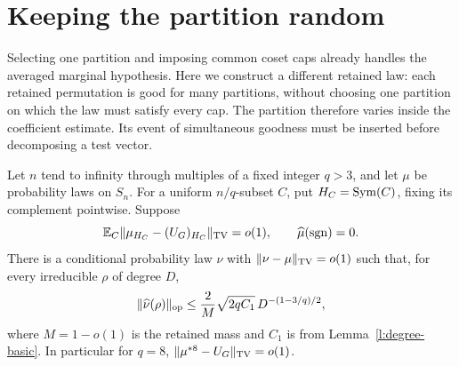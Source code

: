 \section{Keeping the partition random}
\label{l:random-partition-section}

Selecting one partition and imposing common coset caps already handles the
averaged marginal hypothesis. Here we construct a different retained law:
each retained permutation is good for many partitions, without choosing one
partition on which the law must satisfy every cap. The partition therefore
varies inside the coefficient estimate. Its event of simultaneous goodness
must be inserted before decomposing a test vector.

\begin{proposition}\label{l:random-partition}
Let $n$ tend to infinity through multiples of a fixed integer $q>3$,
and let $\mu$ be probability laws on $S_n$.  For a uniform
$n/q$-subset $C$, put $H_C=\operatorname{Sym}(C)$, fixing its complement pointwise.
Suppose
\[
 \mathbb E_C\|\mu_{H_C}-(U_G)_{H_C}\|_{\mathrm{TV}}=o(1),
 \qquad \widehat\mu(\operatorname{sgn})=0.
\]
There is a conditional probability law $\nu$ with
$\|\nu-\mu\|_{\mathrm{TV}}=o(1)$ such that, for every irreducible $\rho$
of degree $D$,
\begin{equation}\label{l:random-op}
 \|\widehat\nu(\rho)\|_{\mathrm{op}}
 \le \frac2M\sqrt{2qC_1}\,D^{-(1-3/q)/2},
\end{equation}
where $M=1-o(1)$ is the retained mass and $C_1$ is from
Lemma~\ref{l:degree-basic}.  In particular for $q=8$,
$\|\mu^{*8}-U_G\|_{\mathrm{TV}}=o(1)$.
\end{proposition}
